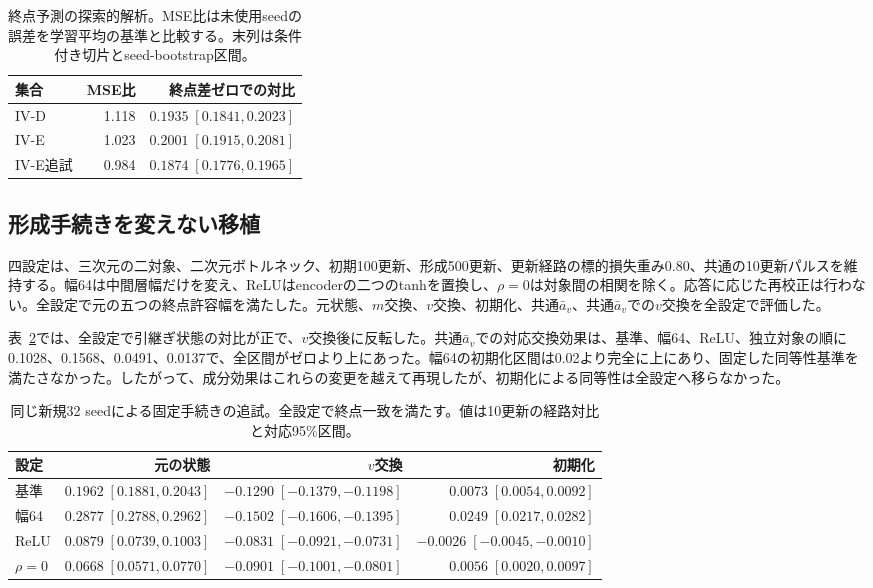 \begin{table}[ht]
\centering\small
\caption{終点予測の探索的解析。MSE比は未使用seedの誤差を学習平均の基準と比較する。末列は条件付き切片とseed-bootstrap区間。}
\label{tab:ivfendpoint}
\begin{tabular}{lrr}
\toprule
集合 & MSE比 & 終点差ゼロでの対比\\
\midrule
IV-D & 1.118 & $0.1935\;[0.1841,0.2023]$ \\
IV-E & 1.023 & $0.2001\;[0.1915,0.2081]$ \\
IV-E追試 & 0.984 & $0.1874\;[0.1776,0.1965]$ \\
\bottomrule
\end{tabular}

\end{table}

\subsection{形成手続きを変えない移植}
四設定は、三次元の二対象、二次元ボトルネック、初期100更新、形成500更新、更新経路の標的損失重み0.80、共通の10更新パルスを維持する。幅64は中間層幅だけを変え、ReLUはencoderの二つのtanhを置換し、$\rho=0$は対象間の相関を除く。応答に応じた再校正は行わない。全設定で元の五つの終点許容幅を満たした。元状態、$m$交換、$v$交換、初期化、共通$\bar a_v$、共通$\bar a_v$での$v$交換を全設定で評価した。

表~\ref{tab:ivfgeneral}では、全設定で引継ぎ状態の対比が正で、$v$交換後に反転した。共通$\bar a_v$での対応交換効果は、基準、幅64、ReLU、独立対象の順に0.1028、0.1568、0.0491、0.0137で、全区間がゼロより上にあった。幅64の初期化区間は0.02より完全に上にあり、固定した同等性基準を満たさなかった。したがって、成分効果はこれらの変更を越えて再現したが、初期化による同等性は全設定へ移らなかった。

\begin{table}[ht]
\centering\small
\caption{同じ新規32 seedによる固定手続きの追試。全設定で終点一致を満たす。値は10更新の経路対比と対応95\%区間。}
\label{tab:ivfgeneral}
\begin{tabular}{lrrr}
\toprule
設定 & 元の状態 & $v$交換 & 初期化\\
\midrule
基準 & $0.1962\;[0.1881,0.2043]$ & $-0.1290\;[-0.1379,-0.1198]$ & $0.0073\;[0.0054,0.0092]$ \\
幅64 & $0.2877\;[0.2788,0.2962]$ & $-0.1502\;[-0.1606,-0.1395]$ & $0.0249\;[0.0217,0.0282]$ \\
ReLU & $0.0879\;[0.0739,0.1003]$ & $-0.0831\;[-0.0921,-0.0731]$ & $-0.0026\;[-0.0045,-0.0010]$ \\
$\rho=0$ & $0.0668\;[0.0571,0.0770]$ & $-0.0901\;[-0.1001,-0.0801]$ & $0.0056\;[0.0020,0.0097]$ \\
\bottomrule
\end{tabular}

\end{table}

